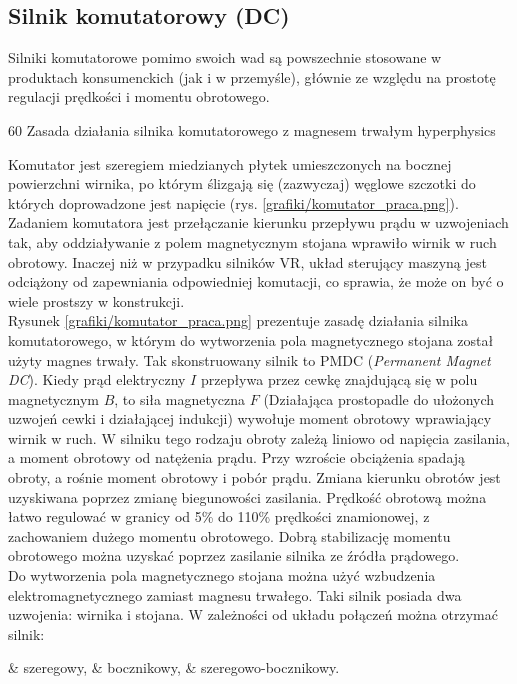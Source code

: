 \subsection{Silnik komutatorowy (DC)}

Silniki komutatorowe pomimo swoich wad są powszechnie stosowane w produktach konsumenckich (jak i w przemyśle), głównie ze względu na prostotę regulacji prędkości i momentu obrotowego. 

		{60}
		{Zasada działania silnika komutatorowego z magnesem trwałym}
		{hyperphysics}

Komutator jest szeregiem miedzianych płytek umieszczonych na bocznej powierzchni wirnika, po którym ślizgają się (zazwyczaj) węglowe szczotki do których doprowadzone jest napięcie (rys. \ref{grafiki/komutator_praca.png}). Zadaniem komutatora jest przełączanie kierunku przepływu prądu w uzwojeniach tak, aby oddziaływanie z polem magnetycznym stojana wprawiło wirnik w ruch obrotowy. Inaczej niż w przypadku silników VR, układ sterujący maszyną jest odciążony od zapewniania odpowiedniej komutacji, co sprawia, że może on być o wiele prostszy w konstrukcji. \\

Rysunek \ref{grafiki/komutator_praca.png} prezentuje zasadę działania silnika komutatorowego, w którym do wytworzenia pola magnetycznego stojana został użyty magnes trwały. Tak skonstruowany silnik to PMDC ({\it Permanent Magnet DC}). Kiedy prąd elektryczny $ I $ przepływa przez cewkę znajdującą się w polu magnetycznym $ B $, to siła magnetyczna $ F $ (Działająca prostopadle do ułożonych uzwojeń cewki i działającej indukcji)  wywołuje moment obrotowy wprawiający wirnik w ruch. W silniku tego rodzaju obroty zależą liniowo od napięcia zasilania, a moment obrotowy od natężenia prądu. Przy wzroście obciążenia spadają obroty, a rośnie moment obrotowy i pobór prądu. Zmiana kierunku obrotów jest uzyskiwana poprzez zmianę biegunowości zasilania. Prędkość obrotową można łatwo regulować w granicy od 5\% do 110\% prędkości znamionowej, z zachowaniem dużego momentu obrotowego. Dobrą stabilizację momentu obrotowego można uzyskać poprzez zasilanie silnika ze źródła prądowego. \\

Do wytworzenia pola magnetycznego stojana można użyć wzbudzenia elektromagnetycznego zamiast magnesu trwałego. Taki silnik posiada dwa uzwojenia: wirnika i stojana. W zależności od układu połączeń można otrzymać silnik:

\begin{easylist}
	& szeregowy,
	& bocznikowy,
	& szeregowo-bocznikowy.
\end{easylist}




